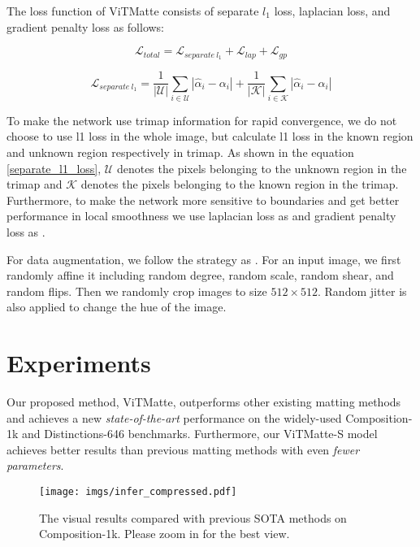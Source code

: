\documentclass[10pt,twocolumn,letterpaper]{article}
\newcommand{\thename}{ViTMatte}
\begin{document}
The loss function of \thename{} consists of separate $l_1$ loss, laplacian loss, and gradient penalty loss as follows:

\begin{equation}
\label{total_loss}
\mathcal{L}_{total}=\mathcal{L}_{separate \ l_1}+\mathcal{L}_{lap}+\mathcal{L}_{gp}
\end{equation}

\begin{equation}
\label{separate_l1_loss}
\mathcal{L}_{separate \ l_1}=\frac{1}{|\mathcal{U}|} \sum_{i \in \mathcal{U}}\left|\hat{\alpha}_i-\alpha_i\right| + \frac{1}{|\mathcal{K}|} \sum_{i \in \mathcal{K}}\left|\hat{\alpha}_i-\alpha_i\right|
\end{equation}

To make the network use trimap information for rapid convergence, we do not choose to use l1 loss in the whole image, but calculate l1 loss in the known region and unknown region respectively in trimap. As shown in the equation \eqref{separate_l1_loss}, $\mathcal{U}$ denotes the pixels belonging to the unknown region in the trimap and $\mathcal{K}$ denotes the pixels belonging to the known region in the trimap. Furthermore, to make the network more sensitive to boundaries and get better performance in local smoothness we use laplacian loss as \cite{CAM} and gradient penalty loss as \cite{rmat}.

For data augmentation, we follow the strategy as \cite{GCAMatting}. For an input image, we first randomly affine it including random degree, random scale, random shear, and random flips. Then we randomly crop images to size $512 \times 512$. Random jitter is also applied to change the hue of the image.

\section{Experiments}
Our proposed method, \thename{}, outperforms other existing matting methods and achieves a new \emph{state-of-the-art} performance on the widely-used Composition-1k and Distinctions-646 benchmarks. Furthermore, our \thename{}-S model achieves better results than previous matting methods with even \emph{fewer parameters}.

\begin{figure*}[htp]
  \centering
    \texttt{[image: imgs/infer\_compressed.pdf]}
  \caption{The visual results compared with previous SOTA methods on Composition-1k. Please zoom in for the best view.}
  \label{fig:infer}
\end{figure*}
\end{document}
